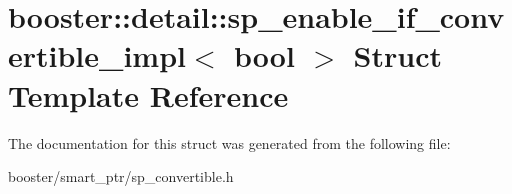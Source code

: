 \section{booster\+:\+:detail\+:\+:sp\+\_\+enable\+\_\+if\+\_\+convertible\+\_\+impl$<$ bool $>$ Struct Template Reference}
\label{structbooster_1_1detail_1_1sp__enable__if__convertible__impl}


The documentation for this struct was generated from the following file\+:\begin{DoxyCompactItemize}
\item 
booster/smart\+\_\+ptr/sp\+\_\+convertible.\+h\end{DoxyCompactItemize}
